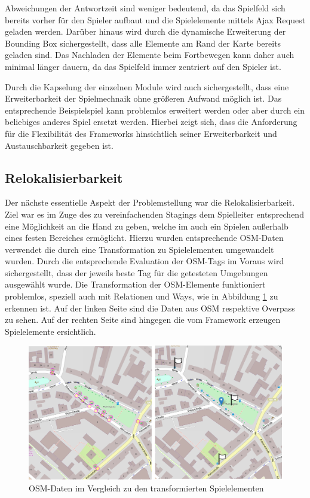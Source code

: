 Abweichungen der Antwortzeit sind weniger bedeutend, da das Spielfeld sich bereits vorher für den Spieler aufbaut und die Spielelemente mittels Ajax Request geladen werden. Darüber hinaus wird durch die dynamische Erweiterung der Bounding Box sichergestellt, dass alle Elemente am Rand der Karte bereits geladen sind. Das Nachladen der Elemente beim Fortbewegen kann daher auch minimal länger dauern, da das Spielfeld immer zentriert auf den Spieler ist.

Durch die Kapselung der einzelnen Module wird auch sichergestellt, dass eine Erweiterbarkeit der Spielmechnaik ohne größeren Aufwand möglich ist. Das entsprechende Beispielspiel kann problemlos erweitert werden oder aber durch ein beliebiges anderes Spiel ersetzt werden.
Hierbei zeigt sich, dass die Anforderung für die Flexibilität des Frameworks hinsichtlich seiner Erweiterbarkeit und Austauschbarkeit gegeben ist.

\subsection*{Relokalisierbarkeit}

Der nächste essentielle Aspekt der Problemstellung war die Relokalisierbarkeit. Ziel war es im Zuge des zu vereinfachenden Stagings dem Spielleiter entsprechend eine Möglichkeit an die Hand zu geben, welche im auch ein Spielen außerhalb eines festen Bereiches ermöglicht. Hierzu wurden entsprechende OSM-Daten verwendet die durch eine Transformation zu Spielelementen umgewandelt wurden. Durch die entsprechende Evaluation der OSM-Tags im Voraus wird sichergestellt, dass der jeweils beste Tag für die getesteten Umgebungen ausgewählt wurde.
Die Transformation der OSM-Elemente funktioniert problemlos, speziell auch mit Relationen und Ways, wie in Abbildung \ref{img:ch6_img02_transform} zu erkennen ist. Auf der linken Seite sind die Daten aus OSM respektive Overpass zu sehen. Auf der rechten Seite sind hingegen die vom Framework erzeugen Spielelemente ersichtlich.


\begin{figure}[H]
\begin{center}
\includegraphics[width=150mm]{images/ch6_img02_transform.png}
\caption{OSM-Daten im Vergleich zu den transformierten Spielelementen}
\label{img:ch6_img02_transform}
\end{center}
\end{figure}

